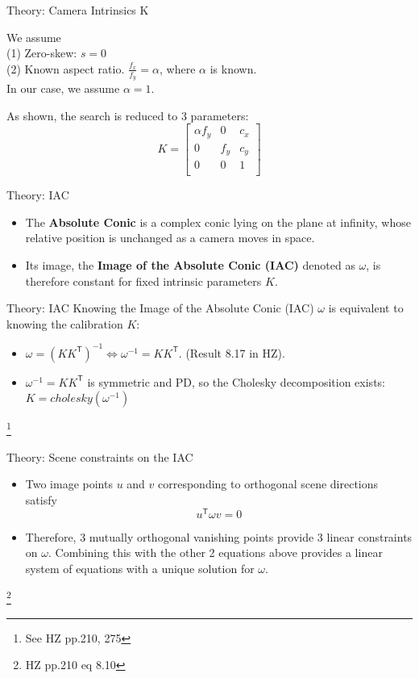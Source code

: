 \documentclass{beamer}
\newcommand\blfootnote[1]{%
	\begingroup
	\renewcommand\thefootnote{}\footnote{#1}%
	\addtocounter{footnote}{-1}%
	\endgroup
}
\begin{document}
\begin{frame}{Theory: Camera Intrinsics K}
	
We assume  \\
(1) Zero-skew: $ s = 0 $  \\
(2) Known aspect ratio. $ \frac{f_x}{f_y} = \alpha $, where $ \alpha $ is known.\\ In our case, we assume $ \alpha=1 $.
 
As shown, the search is reduced to 3 parameters: 
\[
K = 
\begin{bmatrix}
\alpha f_y & 0 & c_x \\
0 & f_y & c_y \\
0 & 0 & 1 \\
\end{bmatrix}
\]
\end{frame}


\begin{frame}{Theory: IAC}
\begin{itemize}
\item The \textbf{Absolute Conic} is a complex conic lying on the plane at infinity, whose relative position is unchanged as a camera moves in space. 
\item Its image, the \textbf{Image of the Absolute Conic (IAC)} denoted as $ \omega $, is therefore constant for fixed intrinsic parameters $ K $.

\end{itemize}
\end{frame}

\begin{frame}{Theory: IAC}
Knowing the Image of the Absolute Conic (IAC) $ \omega $ is equivalent to knowing the calibration $ K $: 
\begin{itemize}
	\item $ \omega = \left( KK^\mathsf{T} \right)^{-1} \Longleftrightarrow  \omega^{-1} = KK^\mathsf{T} $.
    (Result 8.17 in HZ).
	\item  $ \omega^{-1} = KK^\mathsf{T} $ is symmetric and PD, so the Cholesky decomposition exists: 
	$\boxed{ K = cholesky\left(\omega^{-1}\right) }$
\end{itemize}
\blfootnote{See HZ pp.210, 275}
	
\end{frame}

\begin{frame}{Theory: Scene constraints on the IAC}

\begin{itemize}

\item Two image points $ u $ and $ v $ corresponding to orthogonal scene directions satisfy
\[
{u}^\mathsf{T} \omega v = 0
\]

\item Therefore, 3 mutually orthogonal vanishing points provide 3 linear constraints on $ \omega $. Combining this with the other 2 equations above provides a linear system of equations with a unique solution for $ \omega $. \\

\end{itemize}

\blfootnote{HZ pp.210 eq 8.10}
\end{frame}
\end{document}
